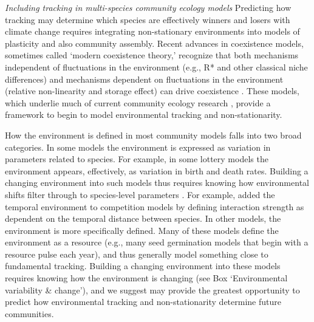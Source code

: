 \documentclass[11pt,letterpaper]{article}
\begin{document}
\emph{Including tracking in multi-species community ecology models}
Predicting how tracking may determine which species are effectively winners and losers with climate change requires integrating non-stationary environments into models of plasticity and also community assembly. Recent advances in coexistence models, sometimes called `modern coexistence theory,' recognize that both mechanisms independent of fluctuations in the environment (e.g., R* and other classical niche differences) and mechanisms dependent on fluctuations in the environment (relative non-linearity and storage effect) can drive coexistence \citep{Chesson:1997dz,Chesson:2000vd}. These models, which underlie much of current community ecology research \citep{Mayfield:2010fe,barabas2018,ellner2019}, provide a framework to begin to model environmental tracking and non-stationarity. 

How the environment is defined in most community models falls into two broad categories. In some models the environment is expressed as variation in parameters related to species. For example, in some lottery models the environment appears, effectively, as variation in birth and death rates. Building a changing environment into such models thus requires knowing how environmental shifts filter through to species-level parameters \citep{Tuljapurkar2009}. For example, \citet{volkerass} added the temporal environment to competition models by defining interaction strength as dependent on the temporal distance between species. In other models, the environment is more specifically defined. Many of these models define the environment as a resource (e.g., many seed germination models that begin with a resource pulse each year), and thus generally model something close to fundamental tracking. Building a changing environment into these models requires knowing how the environment is changing (see Box `Environmental variability \& change'), and we suggest may provide the greatest opportunity to predict how environmental tracking and non-stationarity determine future communities.
\end{document}

